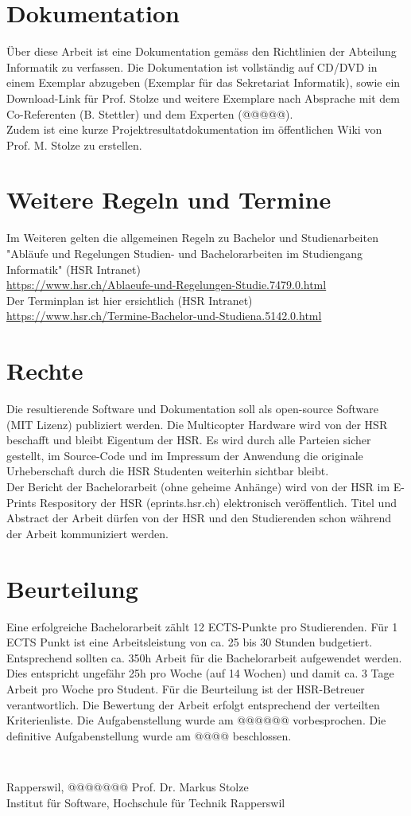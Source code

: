 \section*{Dokumentation}
Über diese Arbeit ist eine Dokumentation gemäss den Richtlinien der Abteilung Informatik zu verfassen. Die Dokumentation ist vollständig auf CD/DVD in einem Exemplar abzugeben (Exemplar für das Sekretariat Informatik), sowie ein Download-Link für Prof. Stolze und weitere Exemplare nach Absprache mit dem Co-Referenten (B. Stettler) und dem Experten (@@@@@).
\\
Zudem ist eine kurze Projektresultatdokumentation im öffentlichen Wiki von Prof. M. Stolze zu erstellen.
\section*{Weitere Regeln und Termine }
Im Weiteren gelten die allgemeinen Regeln zu Bachelor und Studienarbeiten \\
"Abläufe und Regelungen Studien- und Bachelorarbeiten im Studiengang Informatik" (HSR Intranet)\\ \url{https://www.hsr.ch/Ablaeufe-und-Regelungen-Studie.7479.0.html}\\
Der Terminplan ist hier ersichtlich (HSR Intranet)
\\
\url{https://www.hsr.ch/Termine-Bachelor-und-Studiena.5142.0.html}
\section*{Rechte}
Die resultierende Software und Dokumentation soll als open-source Software (MIT Lizenz) publiziert werden. Die Multicopter Hardware wird von der HSR beschafft und bleibt Eigentum der HSR. Es wird durch alle Parteien sicher gestellt, im Source-Code und im Impressum der Anwendung die originale Urheberschaft durch die HSR Studenten weiterhin sichtbar bleibt.
\\
Der Bericht der Bachelorarbeit (ohne geheime Anhänge) wird von der HSR im E-Prints Respository der HSR (eprints.hsr.ch) elektronisch veröffentlich. Titel und Abstract der Arbeit dürfen von der HSR und den Studierenden schon während der Arbeit kommuniziert werden.
\section*{Beurteilung}
Eine erfolgreiche Bachelorarbeit zählt 12 ECTS-Punkte pro Studierenden. Für 1 ECTS Punkt ist eine Arbeitsleistung von ca. 25 bis 30 Stunden budgetiert. Entsprechend sollten ca. 350h Arbeit für die Bachelorarbeit aufgewendet werden. Dies entspricht ungefähr 25h pro Woche (auf 14 Wochen) und damit ca. 3 Tage Arbeit pro Woche pro Student.
Für die Beurteilung ist der HSR-Betreuer verantwortlich. Die Bewertung der Arbeit erfolgt entsprechend der verteilten Kriterienliste.
Die Aufgabenstellung wurde am @@@@@@ vorbesprochen. Die definitive Aufgabenstellung wurde am @@@@ beschlossen. 
\begin{verbatim}


\end{verbatim}
Rapperswil, @@@@@@@ Prof. Dr. Markus Stolze \\
Institut für Software, Hochschule für Technik Rapperswil